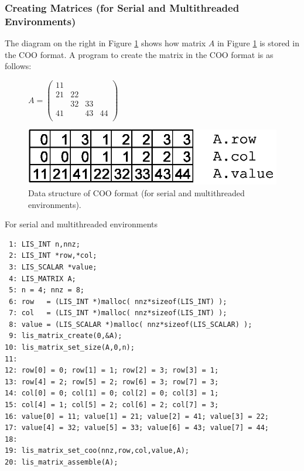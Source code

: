 \documentclass[a4paper]{article}
\begin{document}
\subsubsection{Creating Matrices (for Serial and Multithreaded Environments)}
The diagram on the right in Figure \ref{fig:storage10} shows how matrix $A$ in Figure \ref{fig:storage10} is stored in the COO format. A program to create the matrix in the COO format is as follows:
\begin{figure}[h]
{\centering 
\begin{minipage}{0.3\textwidth}
\begin{flushright}
$ 
A = \left(
\begin{array}{cccc}
11 &    &    &    \\
21 & 22 &    &    \\
   & 32 & 33 &    \\
41 &    & 43 & 44 \\
\end{array}\right)
$
\end{flushright}
\end{minipage}
\begin{minipage}{0.6\textwidth}
\begin{flushleft}
\includegraphics{storage10.eps} 
\end{flushleft}
\end{minipage}
\caption{Data structure of COO format (for serial and multithreaded environments).}\label{fig:storage10}}
\end{figure}
\begin{itemsquarebox}[l]{For serial and multithreaded environments}
\small
\begin{verbatim}
 1: LIS_INT n,nnz;
 2: LIS_INT *row,*col;
 3: LIS_SCALAR *value;
 4: LIS_MATRIX A;
 5: n = 4; nnz = 8;
 6: row   = (LIS_INT *)malloc( nnz*sizeof(LIS_INT) );
 7: col   = (LIS_INT *)malloc( nnz*sizeof(LIS_INT) );
 8: value = (LIS_SCALAR *)malloc( nnz*sizeof(LIS_SCALAR) );
 9: lis_matrix_create(0,&A);
10: lis_matrix_set_size(A,0,n);
11:
12: row[0] = 0; row[1] = 1; row[2] = 3; row[3] = 1;
13: row[4] = 2; row[5] = 2; row[6] = 3; row[7] = 3;
14: col[0] = 0; col[1] = 0; col[2] = 0; col[3] = 1;
15: col[4] = 1; col[5] = 2; col[6] = 2; col[7] = 3;
16: value[0] = 11; value[1] = 21; value[2] = 41; value[3] = 22;
17: value[4] = 32; value[5] = 33; value[6] = 43; value[7] = 44;
18:
19: lis_matrix_set_coo(nnz,row,col,value,A);
20: lis_matrix_assemble(A);
\end{verbatim}
\end{itemsquarebox}
\end{document}
